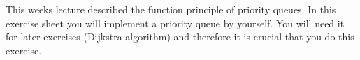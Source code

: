This weeks lecture described the function principle of priority queues. In this exercise sheet you will implement a priority queue by yourself.
You will need it for later exercises (Dijkstra algorithm) and therefore it is crucial that you do this exercise.
